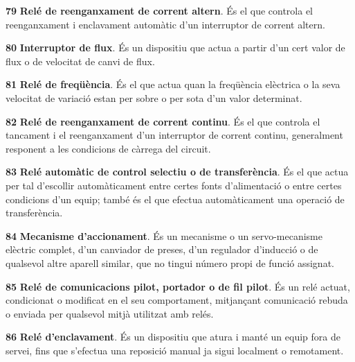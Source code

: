 \begin{multicols}{2}
\begin{list}{}
\item[\textbf{79}]   
\textbf{Relé de
reenganxament de corrent altern}. És el que controla el reenganxament i enclavament automàtic d'un
interruptor de corrent altern.

\item[\textbf{80}]   
\textbf{Interruptor de flux}. És un dispositiu que actua a partir d'un cert valor de flux o de velocitat de canvi de flux.

\item[\textbf{81}]   
\textbf{Relé de freqüència}. És el que actua
quan la freqüència elèctrica o la seva velocitat de variació estan per sobre o per sota d'un valor determinat.

\item[\textbf{82}]   
\textbf{Relé de
reenganxament de corrent continu}. És el que controla el tancament i el reenganxament d'un
interruptor de corrent continu, generalment responent a les condicions de càrrega del
circuit.

\item[\textbf{83}]  
\textbf{Relé automàtic de control selectiu o de transferència}. És
el que actua per tal d'escollir automàticament entre certes fonts
d'alimentació o entre certes condicions d'un equip; també és el que
efectua automàticament una operació de transferència.

\item[\textbf{84}]   
\textbf{Mecanisme d'accionament}. És un
mecanisme o un servo-mecanisme elèctric complet,  d'un canviador de
preses, d'un regulador d'inducció o de qualsevol altre aparell
similar, que no tingui número propi de funció assignat.

\item[\textbf{85}]   
\textbf{Relé de comunicacions pilot, portador o de fil pilot}. És un relé actuat, condicionat o modificat en el seu comportament, mitjançant comunicació rebuda o enviada per qualsevol mitjà utilitzat amb relés.

\item[\textbf{86}]   
\textbf{Relé d'enclavament}. És un dispositiu que atura i manté un equip fora de servei, fins que s'efectua una reposició manual ja sigui localment o remotament.


\end{list}
\end{multicols}
